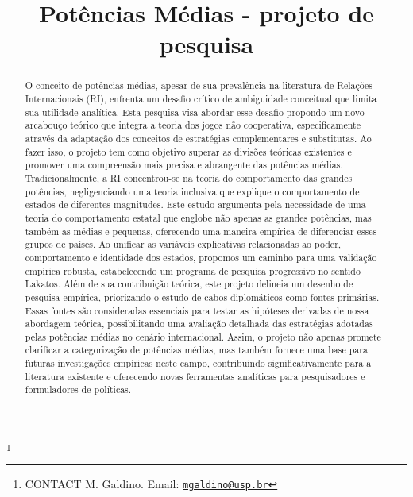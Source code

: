 \documentclass[]{interact}
\theoremstyle{plain}%
\theoremstyle{definition}
\theoremstyle{remark}
\begin{document}

\title{Potências Médias - projeto de pesquisa}


\author{
}

\thanks{CONTACT M.
Galdino. Email: \href{mailto:mgaldino@usp.br}{\nolinkurl{mgaldino@usp.br}}}

\maketitle

\begin{abstract}
O conceito de potências médias, apesar de sua prevalência na literatura
de Relações Internacionais (RI), enfrenta um desafio crítico de
ambiguidade conceitual que limita sua utilidade analítica. Esta pesquisa
visa abordar esse desafio propondo um novo arcabouço teórico que integra
a teoria dos jogos não cooperativa, especificamente através da adaptação
dos conceitos de estratégias complementares e substitutas. Ao fazer
isso, o projeto tem como objetivo superar as divisões teóricas
existentes e promover uma compreensão mais precisa e abrangente das
potências médias. Tradicionalmente, a RI concentrou-se na teoria do
comportamento das grandes potências, negligenciando uma teoria inclusiva
que explique o comportamento de estados de diferentes magnitudes. Este
estudo argumenta pela necessidade de uma teoria do comportamento estatal
que englobe não apenas as grandes potências, mas também as médias e
pequenas, oferecendo uma maneira empírica de diferenciar esses grupos de
países. Ao unificar as variáveis explicativas relacionadas ao poder,
comportamento e identidade dos estados, propomos um caminho para uma
validação empírica robusta, estabelecendo um programa de pesquisa
progressivo no sentido Lakatos. Além de sua contribuição teórica, este
projeto delineia um desenho de pesquisa empírica, priorizando o estudo
de cabos diplomáticos como fontes primárias. Essas fontes são
consideradas essenciais para testar as hipóteses derivadas de nossa
abordagem teórica, possibilitando uma avaliação detalhada das
estratégias adotadas pelas potências médias no cenário internacional.
Assim, o projeto não apenas promete clarificar a categorização de
potências médias, mas também fornece uma base para futuras investigações
empíricas neste campo, contribuindo significativamente para a literatura
existente e oferecendo novas ferramentas analíticas para pesquisadores e
formuladores de políticas.
\end{abstract}
\end{document}
